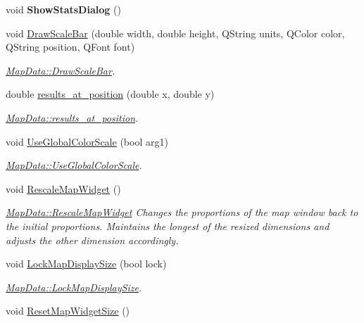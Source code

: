 \begin{DoxyCompactItemize}
\item 
\hypertarget{class_map_data_ad71bce0881234bfd6a8d17aee3bb9755}{void {\bfseries Show\+Stats\+Dialog} ()}\label{class_map_data_ad71bce0881234bfd6a8d17aee3bb9755}

\item 
void \hyperlink{class_map_data_addb50d1d449353343157ab45d6d96c1a}{Draw\+Scale\+Bar} (double width, double height, Q\+String units, Q\+Color color, Q\+String position, Q\+Font font)
\begin{DoxyCompactList}\small\item\em \hyperlink{class_map_data_addb50d1d449353343157ab45d6d96c1a}{Map\+Data\+::\+Draw\+Scale\+Bar}. \end{DoxyCompactList}\item 
double \hyperlink{class_map_data_ad209dc0ec9935f2d551867af307594d0}{results\+\_\+at\+\_\+position} (double x, double y)
\begin{DoxyCompactList}\small\item\em \hyperlink{class_map_data_ad209dc0ec9935f2d551867af307594d0}{Map\+Data\+::results\+\_\+at\+\_\+position}. \end{DoxyCompactList}\item 
void \hyperlink{class_map_data_af30cb1a76812d7904c1f571a8e1fe1e4}{Use\+Global\+Color\+Scale} (bool arg1)
\begin{DoxyCompactList}\small\item\em \hyperlink{class_map_data_af30cb1a76812d7904c1f571a8e1fe1e4}{Map\+Data\+::\+Use\+Global\+Color\+Scale}. \end{DoxyCompactList}\item 
\hypertarget{class_map_data_acdaa2f55e2cbf4ad03582b3d1bc99c2e}{void \hyperlink{class_map_data_acdaa2f55e2cbf4ad03582b3d1bc99c2e}{Rescale\+Map\+Widget} ()}\label{class_map_data_acdaa2f55e2cbf4ad03582b3d1bc99c2e}

\begin{DoxyCompactList}\small\item\em \hyperlink{class_map_data_acdaa2f55e2cbf4ad03582b3d1bc99c2e}{Map\+Data\+::\+Rescale\+Map\+Widget} Changes the proportions of the map window back to the initial proportions. Maintains the longest of the resized dimensions and adjusts the other dimension accordingly. \end{DoxyCompactList}\item 
void \hyperlink{class_map_data_a980161f78d12c23787f6593e0ea79282}{Lock\+Map\+Display\+Size} (bool lock)
\begin{DoxyCompactList}\small\item\em \hyperlink{class_map_data_a980161f78d12c23787f6593e0ea79282}{Map\+Data\+::\+Lock\+Map\+Display\+Size}. \end{DoxyCompactList}\item 
\hypertarget{class_map_data_a795493559eec5070c21ba9561af583d9}{void \hyperlink{class_map_data_a795493559eec5070c21ba9561af583d9}{Reset\+Map\+Widget\+Size} ()}\label{class_map_data_a795493559eec5070c21ba9561af583d9}


\end{DoxyCompactItemize}
